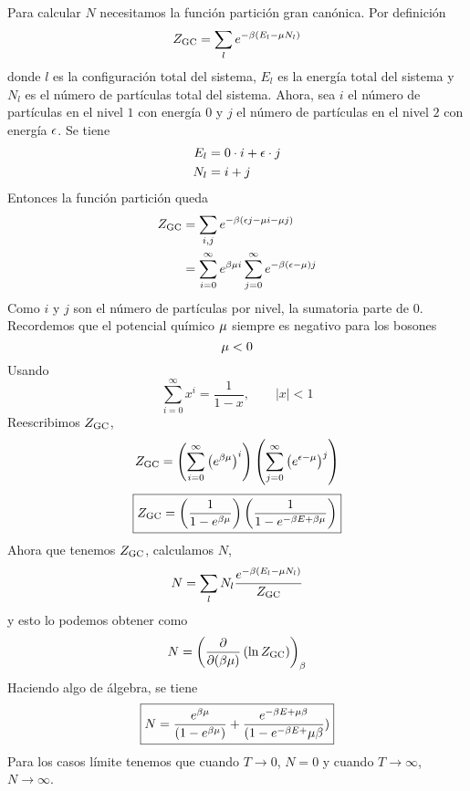 \begin{sol}
Para calcular $N$ necesitamos la función partición gran canónica. Por definición
\begin{equation}
  Z_{\rm GC}=\sum_l e^{-\beta(E_l-\mu N_l)}
\end{equation}
donde $l$ es la configuración total del sistema, $E_l$ es la energía total del sistema y $N_l$ es el número de partículas total del sistema. Ahora, sea $i$ el número de partículas en el nivel $1$ con energía $0$ y $j$ el número de partículas en el nivel $2$ con energía $\epsilon$. Se tiene
\begin{align}
  E_l&=0\cdot i+\epsilon\cdot j\\
  N_l&=i+j
\end{align}
Entonces la función partición queda
\begin{align}
  Z_{\rm GC}&=\sum_{i,j}e^{-\beta(\epsilon j-\mu i-\mu j)}\\
  &=\sum_{i=0}^\infty e^{\beta\mu i}\sum_{j=0}^\infty e^{-\beta (\epsilon-\mu)j}
\end{align}
Como $i$ y $j$ son el número de partículas por nivel, la sumatoria parte de $0$. Recordemos que el potencial químico $\mu$ siempre es negativo para los bosones
\begin{equation}
  \mu <0 
\end{equation}
Usando 
\begin{equation}
  \sum_{i=0}^\infty x^{i}=\frac{1}{1-x},\qquad |x|<1
\end{equation}
Reescribimos $Z_{\rm GC}$,
\begin{equation}
  Z_{\rm GC}=\left(\sum_{i=0}^\infty\left(e^{\beta\mu }\right)^{i}\right)\left(\sum_{j=0}^\infty\left(e^{\epsilon-\mu  }\right)^{j}\right)
\end{equation}
\begin{equation}
 \boxed{ Z_{\rm GC}=\left(\frac{1}{1-e^{\beta\mu }}\right)\left(\frac{1}{1-e^{-\beta E+\beta \mu }}\right)}
\end{equation}
Ahora que tenemos $Z_{\rm GC}$, calculamos
$N$,
\begin{equation}
  N=\sum_l N_l\frac{e^{-\beta (E_l-\mu N_l)}}{Z_{\rm GC}}
\end{equation}
y esto lo podemos obtener como
\begin{equation}
  N=\left(\pdv{(\beta\mu)}\left(\ln Z_{\rm GC}\right)\right)_\beta 
\end{equation}
Haciendo algo de álgebra, se tiene
\begin{equation}
\boxed{  N=\frac{e^{\beta\mu }}{(1-e^{\beta\mu })}+\frac{e^{-\beta E+\mu \beta }}{(1-e^{-\beta E +}\mu\beta })}
\end{equation}
Para los casos límite tenemos que cuando $T\to  0$, $N=0$ y cuando $T\to\infty$, $N\to \infty$.


















\end{sol}
